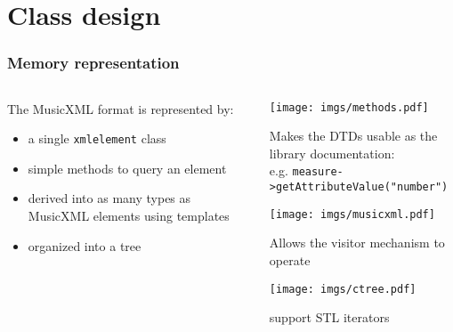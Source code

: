 \documentclass{beamer}
\begin{document}
\section{Class design}
\begin{frame}
  \frametitle{Memory representation}
  \begin{columns}
    \begin{column}[c]{7cm}
    The MusicXML format is represented by:
    {\small
        
\begin{itemize}
        \item<1-> a single \texttt{xmlelement} class
        \item<3-> simple methods to query an element
        \item<5-> derived into as many types as MusicXML elements using templates
        \item<7-> organized into a tree
        \end{itemize}}
    \end{column}

    \begin{column}[c]{5cm}
    \begin{overlayarea}{\textwidth}{50mm}
    {\small
       {\vspace{9mm} \texttt{[image: imgs/methods.pdf]}}
      {\vspace{9mm} \begin{block}{}
        Makes the DTDs usable as the library documentation:\\
        e.g. {\tiny \texttt{measure->getAttributeValue("number")}}
        \end{block}}
        {\vspace{12mm}\texttt{[image: imgs/musicxml.pdf]}}
      {\vspace{22mm} \begin{block}{}
        Allows the visitor mechanism to operate
        \end{block}}
       {\vspace{12mm} \texttt{[image: imgs/ctree.pdf]}}
       {\vspace{32mm} \begin{block}{}
        support STL iterators
        \end{block}}
    }
    \end{overlayarea}
    \end{column}
  \end{columns}
\end{frame}
\end{document}
